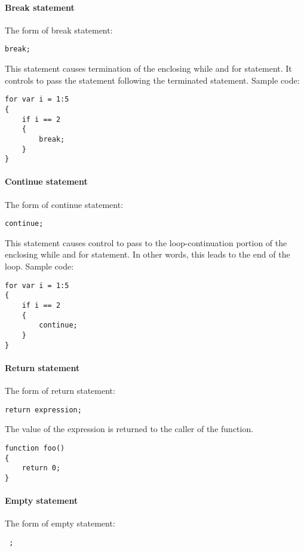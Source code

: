 \documentclass[12pt]{article} %
\begin{document}
\paragraph{Break statement}
The form of break statement:
\begin{lstlisting}
break;
\end{lstlisting}
\noindent This statement causes termination of the enclosing while and for statement. It controls to pass the statement following the terminated statement. Sample code:

\begin{lstlisting}
for var i = 1:5
{
	if i == 2
	{
		break;
	}
}
\end{lstlisting}


\paragraph{Continue statement}
The form of continue statement:

\begin{lstlisting}
continue;
\end{lstlisting}

\noindent This statement causes control to pass to the loop-continuation portion of the enclosing while and for statement. In other words, this leads to the end of the loop. Sample code:

\begin{lstlisting}
for var i = 1:5
{
	if i == 2
	{
		continue;
	}
}
\end{lstlisting}


\paragraph{Return statement}
The form of return statement:
\begin{lstlisting}
return expression;
\end{lstlisting}
The value of the expression is returned to the caller of the function.   


\begin{lstlisting}
function foo()
{
	return 0;
}
\end{lstlisting}

\paragraph{Empty statement}
The form of empty statement:

\begin{lstlisting}
 ;
\end{lstlisting}
\end{document}
